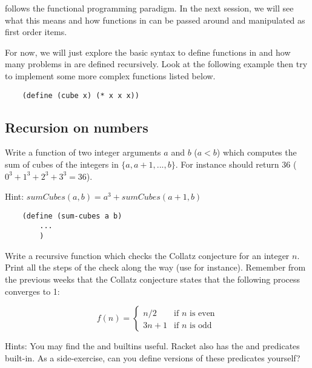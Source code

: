 \documentclass{../../../tp}
\begin{document}
\scheme follows the functional programming paradigm. In the next session, we will see what this means and how functions in \scheme can be passed around and manipulated as first order items.

For now, we will just explore the basic syntax to define functions in \scheme and how many problems in \scheme are defined recursively. Look at the following example then try to implement some more complex functions listed below.

\begin{verbatim}
	(define (cube x) (* x x x))
\end{verbatim}




\subsection{Recursion on numbers}



\begin{instruction}
	Write a function  of two integer arguments $a$ and $b$ ($a < b$) which computes the sum of cubes of the integers in $\{a, a+1, ...,  b\}$. For instance  should return 36 ($0^3 + 1^3 + 2^3 + 3^3 = 36$).
	
	Hint: $sumCubes(a,b) = a^3 + sumCubes(a+1, b)$
	
	\begin{verbatim}
	(define (sum-cubes a b) 
		... 
		)
	\end{verbatim}
\end{instruction}



\begin{instruction}	
	
	Write a recursive function  which checks the Collatz conjecture for an integer $n$. Print all the steps of the check along the way (use   for instance). Remember from the previous weeks that the Collatz conjecture states that the following process converges to 1:
	
		\begin{equation*}
		f(n) = 
		\begin{cases}
		n/2 & \text{if $n$ is even} \\
		3n + 1 & \text{if $n$ is odd} 
		\end{cases}
		\end{equation*}
	
	Hints: You may find the  and  builtins useful. Racket also has the   and  predicates built-in. As a side-exercise, can you define versions of these predicates yourself?
\end{instruction}
\end{document}
